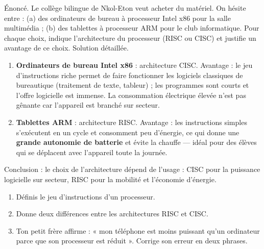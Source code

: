 \documentclass[11pt]{article}
\newcommand{\cle}[1]{{\popxbold\color{popdark}#1}}
\begin{document}
\begin{exoresolu}
Énoncé. Le collège bilingue de Nkol-Eton veut acheter du matériel. On hésite entre : (a) des ordinateurs de bureau à processeur Intel x86 pour la salle multimédia ; (b) des tablettes à processeur ARM pour le club informatique. Pour chaque choix, indique l'architecture du processeur (RISC ou CISC) et justifie un avantage de ce choix.
\tcblower
Solution détaillée.
\begin{enumerate}
  \item \textbf{Ordinateurs de bureau Intel x86} : architecture \cle{CISC}. Avantage : le jeu d'instructions riche permet de faire fonctionner les logiciels classiques de bureautique (traitement de texte, tableur) ; les programmes sont courts et l'offre logicielle est immense. La consommation électrique élevée n'est pas gênante car l'appareil est branché sur secteur.
  \item \textbf{Tablettes ARM} : architecture \cle{RISC}. Avantage : les instructions simples s'exécutent en un cycle et consomment peu d'énergie, ce qui donne une \textbf{grande autonomie de batterie} et évite la chauffe — idéal pour des élèves qui se déplacent avec l'appareil toute la journée.
\end{enumerate}
Conclusion : le choix de l'architecture dépend de l'usage : CISC pour la puissance logicielle sur secteur, RISC pour la mobilité et l'économie d'énergie.
\end{exoresolu}

\begin{exercice}
\begin{enumerate}
  \item Définis le jeu d'instructions d'un processeur.
  \item Donne deux différences entre les architectures RISC et CISC.
  \item Ton petit frère affirme : « mon téléphone est moins puissant qu'un ordinateur parce que son processeur est réduit ». Corrige son erreur en deux phrases.
\end{enumerate}
\end{exercice}
\end{document}

